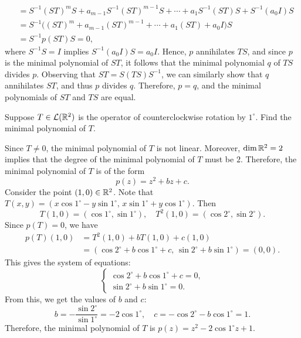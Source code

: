 \begin{exc}
\begin{solution}
\begin{parts}
\begin{align*}
        &= S^{-1}(ST)^mS+a_{m-1}S^{-1}(ST)^{m-1}S+\cdots+a_1S^{-1}(ST)S
           +S^{-1}(a_0I)S\\
        &= S^{-1}\bigl((ST)^m+a_{m-1}(ST)^{m-1}+\cdots+a_1(ST)+a_0I\bigr)S\\
        &= S^{-1}p(ST)S=0,
  \end{align*}
  where $S^{-1}S=I$ implies $S^{-1}(a_0I)S=a_0I$. Hence, $p$ annihilates $TS$,
  and since $p$ is the minimal polynomial of $ST$, it follows that the minimal
  polynomial $q$ of $TS$ divides $p$. Observing that $ST=S(TS)S^{-1}$, we can
  similarly show that $q$ annihilates $ST$, and thus $p$ divides $q$.
  Therefore, $p=q$, and the minimal polynomials of $ST$ and $TS$ are equal.
  \qedhere
\end{parts}
\end{solution}

\begin{exercise}
Suppose $T\in\mathcal{L}(\mathbb{R}^2)$ is the operator of counterclockwise rotation by
$1^\circ$. Find the minimal polynomial of $T$.
\end{exercise}
\begin{solution}
Since $T\ne0$, the minimal polynomial of $T$ is not linear. Moreover,
$\operatorname{dim}\mathbb{R}^2=2$ implies that the degree of the minimal polynomial of $T$ must be
$2$. Therefore, the minimal polynomial of $T$ is of the form
\[ p(z)=z^2+bz+c. \]
Consider the point $(1,0)\in\mathbb{R}^2$. Note that
$T(x,y)=(x\cos1^\circ-y\sin1^\circ,\,x\sin1^\circ+y\cos1^\circ)$. Then
\[ T(1,0)=(\cos1^\circ,\sin1^\circ),\quad T^2(1,0)=(\cos2^\circ,\sin2^\circ). \]
Since $p(T)=0$, we have
\begin{align*}
p(T)(1,0) &= T^2(1,0)+bT(1,0)+c(1,0)\\
          &= (\cos2^\circ+b\cos1^\circ+c,\,\sin2^\circ+b\sin1^\circ)=(0,0).
\end{align*}
This gives the system of equations:
\[ \begin{cases} \cos2^\circ+b\cos1^\circ+c=0,\\
   \sin2^\circ+b\sin1^\circ=0. \end{cases} \]
From this, we get the values of $b$ and $c$:
\[ b=-\frac{\sin2^\circ}{\sin1^\circ}=-2\cos1^\circ,\quad
   c=-\cos2^\circ-b\cos1^\circ=1. \]
Therefore, the minimal polynomial of $T$ is $p(z)=z^2-2\cos1^\circ z+1$.
\end{solution}


\end{exc}
